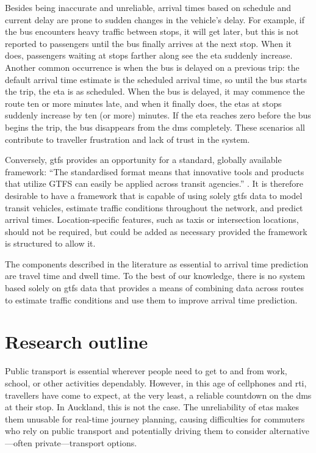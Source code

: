 Besides being inaccurate and unreliable, arrival times based on schedule and current delay are prone to sudden changes in the vehicle's delay. For example, if the bus encounters heavy traffic between stops, it will get later, but this is not reported to passengers until the bus finally arrives at the next stop. When it does, passengers waiting at stops farther along see the \gls{eta} suddenly increase. Another common occurrence is when the bus is delayed on a previous trip: the default arrival time estimate is the scheduled arrival time, so until the bus starts the trip, the \gls{eta} is as scheduled. When the bus is delayed, it may commence the route ten or more minutes late, and when it finally does, the \glspl{eta} at stops suddenly increase by ten (or more) minutes. If the \gls{eta} reaches zero before the bus begins the trip, the bus disappears from the \gls{dms} completely. These scenarios all contribute to traveller frustration and lack of trust in the system.


Conversely, \gls{gtfs} provides an opportunity for a standard, globally available framework: ``The standardised format means that innovative tools and products that utilize GTFS can easily be applied across transit agencies.'' \citep[26]{TCRP_2020}. It is therefore desirable to have a framework that is capable of using solely \gls{gtfs} data to model transit vehicles, estimate traffic conditions throughout the network, and predict arrival times. Location-specific features, such as taxis or intersection locations, should not be required, but could be added as necessary provided the framework is structured to allow it.


The components described in the literature as essential to arrival time prediction are travel time and dwell time. To the best of our knowledge, there is no system based solely on \gls{gtfs} data that provides a means of combining data across routes to estimate traffic conditions and use them to improve arrival time prediction.



\section{Research outline}
\label{sec:proposal}

Public transport is essential wherever people need to get to and from work, school, or other activities dependably. However, in this age of cellphones and \gls{rti}, travellers have come to expect, at the very least, a reliable countdown on the \gls{dms} at their stop. In Auckland, this is not the case. The unreliability of \glspl{eta} makes them unusable for real-time journey planning, causing difficulties for commuters who rely on public transport and potentially driving them to consider alternative---often private---transport options.


